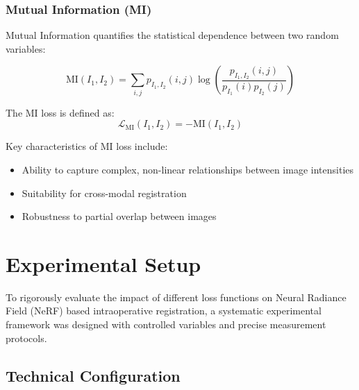 \subsubsection{Mutual Information (MI)}

Mutual Information quantifies the statistical dependence between two random variables:

\begin{equation}
\text{MI}(I_1, I_2) = \sum_{i,j} p_{I_1,I_2}(i,j) \log\left(\frac{p_{I_1,I_2}(i,j)}{p_{I_1}(i)p_{I_2}(j)}\right)
\end{equation}

The MI loss is defined as:
\begin{equation}
\mathcal{L}_{\text{MI}}(I_1, I_2) = -\text{MI}(I_1, I_2)
\end{equation}

Key characteristics of MI loss include:
\begin{itemize}
    \item Ability to capture complex, non-linear relationships between image intensities
    \item Suitability for cross-modal registration
    \item Robustness to partial overlap between images
\end{itemize}

\section{Experimental Setup}

To rigorously evaluate the impact of different loss functions on Neural Radiance Field (NeRF) based intraoperative registration, a systematic experimental framework was designed with controlled variables and precise measurement protocols.

\subsection{Technical Configuration}

